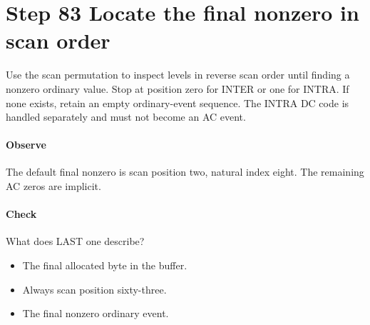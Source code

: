 \section{Step 83 Locate the final nonzero in scan order}\label{h263-coeff-s03}
Use the scan permutation to inspect levels in reverse scan order until finding
a nonzero ordinary value. Stop at position zero for INTER or one for INTRA.
If none exists, retain an empty ordinary-event sequence. The INTRA DC code is
handled separately and must not become an AC event.

\paragraph{Observe} The default final nonzero is scan position two, natural
index eight. The remaining AC zeros are implicit.
\paragraph{Check} What does LAST one describe?
\begin{itemize}
  \item[A.] The final allocated byte in the buffer.
  \item[B.] Always scan position sixty-three.
  \item[C.] The final nonzero ordinary event.
\end{itemize}
